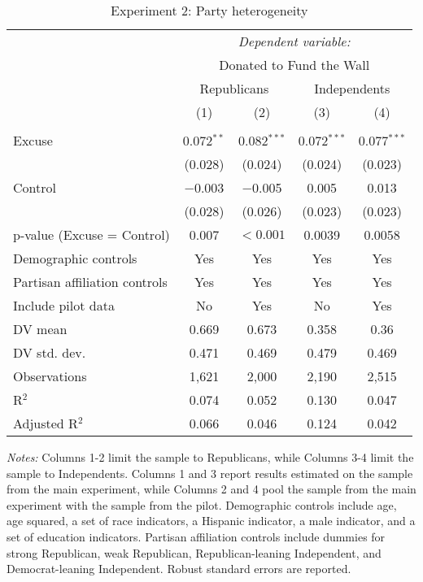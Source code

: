 
\begin{table}[!htbp] \centering 
  \caption{Experiment 2: Party heterogeneity} 
  \label{t:2-partyheterogeneity} 
\begin{threeparttable}
\begin{tabular}{@{\hspace{5pt}}l@{\hspace{5pt}}cccc} 
\toprule 
 & \multicolumn{4}{c}{\textit{Dependent variable:}} \\ 
\cmidrule(rr){2-5} 
 & \multicolumn{4}{c}{Donated to Fund the Wall} \\ 
 \cmidrule(rr){2-5}
 & \multicolumn{2}{c}{Republicans} & \multicolumn{2}{c}{Independents} \\ 
 & (1) & (2) & (3) & (4)\\ 
\midrule  
\\[-2.1ex] Excuse & 0.072$^{**}$ & 0.082$^{***}$ & 0.072$^{***}$ & 0.077$^{***}$ \\ 
  & (0.028) & (0.024) & (0.024) & (0.023) \\ 
 \addlinespace 
 Control & $-$0.003 & $-$0.005 & 0.005 & 0.013 \\ 
  & (0.028) & (0.026) & (0.023) & (0.023) \\ 
 \addlinespace 
p-value (Excuse = Control) & 0.007 & $<0.001$ & 0.0039 & 0.0058 \\ 
\midrule  
Demographic controls & Yes & Yes & Yes & Yes \\ 
Partisan affiliation controls & Yes & Yes & Yes & Yes \\ 
\midrule
Include pilot data & No & Yes & No & Yes \\
\addlinespace
DV mean & 0.669 & 0.673 & 0.358 & 0.36 \\
DV std. dev. & 0.471 & 0.469 & 0.479 & 0.469 \\
Observations & 1,621 & 2,000 & 2,190 & 2,515 \\ 
R$^{2}$ & 0.074 & 0.052 & 0.130 & 0.047 \\ 
Adjusted R$^{2}$ & 0.066 & 0.046 & 0.124 & 0.042 \\ 
\bottomrule 
\end{tabular} 
\begin{tablenotes}
\footnotesize
\item \textit{Notes:} Columns 1-2 limit the sample to Republicans, while Columns 3-4 limit the sample to Independents. Columns 1 and 3 report results estimated on the sample from the main experiment, while Columns 2 and 4 pool the sample from the main experiment with the sample from the pilot. Demographic controls include age, age squared, a set of race indicators, a Hispanic indicator, a male indicator, and a set of education indicators. Partisan affiliation controls include dummies for strong Republican, weak Republican, Republican-leaning Independent, and Democrat-leaning Independent. Robust standard errors are reported.
\end{tablenotes}
\end{threeparttable}
\end{table} 
